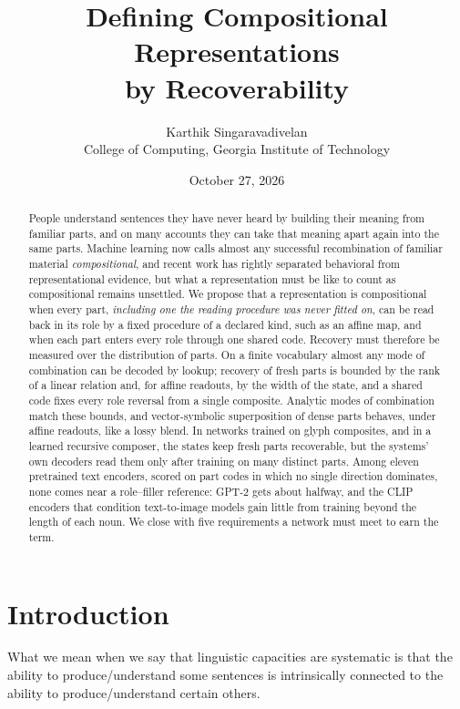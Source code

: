 \documentclass[10pt]{article}
\title{Defining Compositional Representations\\ by Recoverability}
\author{Karthik Singaravadivelan\\ College of Computing, Georgia Institute of Technology}
\date{October 27, 2026}
\theoremstyle{plain}
\theoremstyle{remark}
\begin{document}
\maketitle

\begin{abstract}
People understand sentences they have never heard by building their meaning from familiar parts, and on many accounts they can take that meaning apart again into the same parts. Machine learning now calls almost any successful recombination of familiar material \emph{compositional}, and recent work has rightly separated behavioral from representational evidence, but what a representation must be like to count as compositional remains unsettled. We propose that a representation is compositional when every part, \emph{including one the reading procedure was never fitted on}, can be read back in its role by a fixed procedure of a declared kind, such as an affine map, and when each part enters every role through one shared code. Recovery must therefore be measured over the distribution of parts. On a finite vocabulary almost any mode of combination can be decoded by lookup; recovery of fresh parts is bounded by the rank of a linear relation and, for affine readouts, by the width of the state, and a shared code fixes every role reversal from a single composite. Analytic modes of combination match these bounds, and vector-symbolic superposition of dense parts behaves, under affine readouts, like a lossy blend. In networks trained on glyph composites, and in a learned recursive composer, the states keep fresh parts recoverable, but the systems' own decoders read them only after training on many distinct parts. Among eleven pretrained text encoders, scored on part codes in which no single direction dominates, none comes near a role--filler reference: GPT-2 gets about halfway, and the CLIP encoders that condition text-to-image models gain little from training beyond the length of each noun. We close with five requirements a network must meet to earn the term.
\end{abstract}

\section{Introduction}
\label{sec:intro}

\epigraph{What we mean when we say that linguistic capacities are systematic is that the ability to produce/understand some sentences is intrinsically connected to the ability to produce/understand certain others.}{\citet{fodor1988}}
\end{document}

